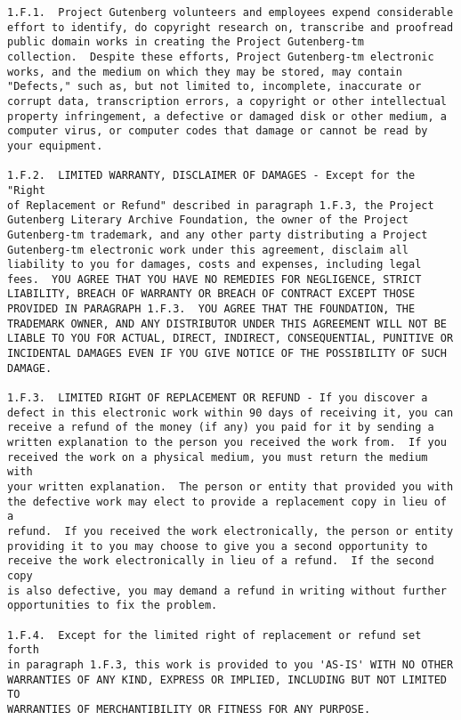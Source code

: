 \documentclass[oneside]{book}
\begin{document}
\begin{verbatim}
1.F.1.  Project Gutenberg volunteers and employees expend considerable
effort to identify, do copyright research on, transcribe and proofread
public domain works in creating the Project Gutenberg-tm
collection.  Despite these efforts, Project Gutenberg-tm electronic
works, and the medium on which they may be stored, may contain
"Defects," such as, but not limited to, incomplete, inaccurate or
corrupt data, transcription errors, a copyright or other intellectual
property infringement, a defective or damaged disk or other medium, a
computer virus, or computer codes that damage or cannot be read by
your equipment.

1.F.2.  LIMITED WARRANTY, DISCLAIMER OF DAMAGES - Except for the "Right
of Replacement or Refund" described in paragraph 1.F.3, the Project
Gutenberg Literary Archive Foundation, the owner of the Project
Gutenberg-tm trademark, and any other party distributing a Project
Gutenberg-tm electronic work under this agreement, disclaim all
liability to you for damages, costs and expenses, including legal
fees.  YOU AGREE THAT YOU HAVE NO REMEDIES FOR NEGLIGENCE, STRICT
LIABILITY, BREACH OF WARRANTY OR BREACH OF CONTRACT EXCEPT THOSE
PROVIDED IN PARAGRAPH 1.F.3.  YOU AGREE THAT THE FOUNDATION, THE
TRADEMARK OWNER, AND ANY DISTRIBUTOR UNDER THIS AGREEMENT WILL NOT BE
LIABLE TO YOU FOR ACTUAL, DIRECT, INDIRECT, CONSEQUENTIAL, PUNITIVE OR
INCIDENTAL DAMAGES EVEN IF YOU GIVE NOTICE OF THE POSSIBILITY OF SUCH
DAMAGE.

1.F.3.  LIMITED RIGHT OF REPLACEMENT OR REFUND - If you discover a
defect in this electronic work within 90 days of receiving it, you can
receive a refund of the money (if any) you paid for it by sending a
written explanation to the person you received the work from.  If you
received the work on a physical medium, you must return the medium with
your written explanation.  The person or entity that provided you with
the defective work may elect to provide a replacement copy in lieu of a
refund.  If you received the work electronically, the person or entity
providing it to you may choose to give you a second opportunity to
receive the work electronically in lieu of a refund.  If the second copy
is also defective, you may demand a refund in writing without further
opportunities to fix the problem.

1.F.4.  Except for the limited right of replacement or refund set forth
in paragraph 1.F.3, this work is provided to you 'AS-IS' WITH NO OTHER
WARRANTIES OF ANY KIND, EXPRESS OR IMPLIED, INCLUDING BUT NOT LIMITED TO
WARRANTIES OF MERCHANTIBILITY OR FITNESS FOR ANY PURPOSE.


\end{verbatim}
\end{document}
